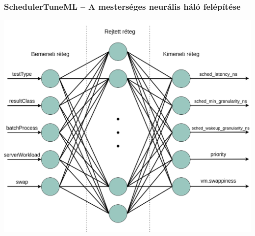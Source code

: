 \documentclass{beamer}
\begin{document}
\begin{frame}
	\frametitle{SchedulerTuneML -- A mesterséges neurális háló felépítése}

\begin{center}
\includegraphics[scale=0.2]{images/neuralNetwork.png}
\end{center}

\end{frame}
\end{document}
